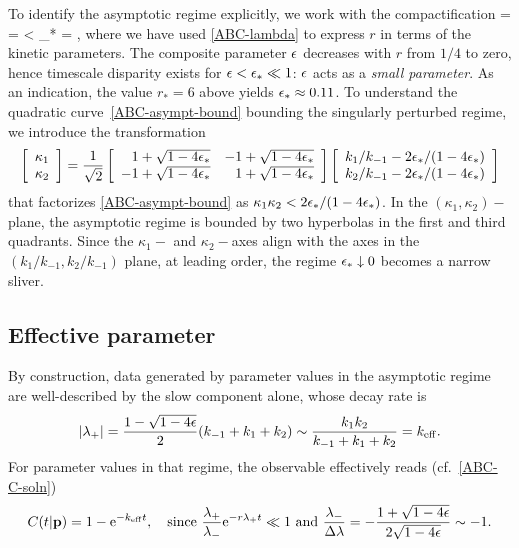 To identify the asymptotic regime explicitly, we work with the compactification
%
\be
 \eps
=
=
<
 \eps_*
=
 ,
\label{ABC-asympt-bound}
\ee
%
where we have used \eqref{ABC-lambda} to express $r$ in terms of the kinetic parameters.
The composite parameter $\epsilon$ decreases with $r$ from $1/4$ to zero,
hence timescale disparity exists for $\epsilon < \epsilon_* \ll 1$: $\epsilon$ acts as a \emph{small parameter}.
As an indication, the value $r_*=6$ above yields $\epsilon_* \approx 0.11$.
To understand the quadratic curve~\eqref{ABC-asympt-bound} bounding the singularly perturbed regime,
we introduce the transformation
%
\[
\left[\begin{array}{c}
 \kappa_1 \\ \kappa_2
\end{array}\right]
=
 \frac{1}{\sqrt2}
%
\left[\begin{array}{rr}
 1+\sqrt{1-4\eps_*} & -1+\sqrt{1-4\eps_*} \\ -1+\sqrt{1-4\eps_*} & 1+\sqrt{1-4\eps_*}
\end{array}\right]
%
\left[\begin{array}{c}
 k_1/k_{-1} - 2 \eps_*/(1 - 4 \eps_*) \\ k_2/k_{-1} - 2 \eps_*/(1 - 4 \eps_*)
\end{array}\right]
\]
%
that factorizes \eqref{ABC-asympt-bound} as $\kappa_1 \kappa_2 < 2 \epsilon_*/(1 - 4 \epsilon_*)$.
In the $(\kappa_1,\kappa_2)-$plane, the asymptotic regime is bounded by two hyperbolas in the first and third quadrants.
Since the $\kappa_1-$ and $\kappa_2-$axes align with the axes in the $(k_1/k_{-1},k_2/k_{-1})$ plane, at leading order,
the regime $\epsilon_* \downarrow 0$ becomes a narrow sliver.\\
%
\subsection{Effective parameter}
%
By construction, data generated by parameter values in the asymptotic
regime are well-described by the slow component alone, whose decay
rate is
%
\[
 \vert \lambda_+ \vert
=
 \frac{1 - \sqrt{1-4\epsilon}}{2}
 (k_{-1}+k_1+k_2)
\sim
 \frac{k_1 k_2}{k_{-1}+k_1+k_2}
=
 k_\mathrm{eff} .
\]
%
For parameter values in that regime, the observable effectively reads (cf.~\eqref{ABC-C-soln})
%
\[
 C(t \vert \mathbf{p})
=
 1
-
 \mathrm{e}^{-k_\mathrm{eff} t} ,
\quad\mbox{since}\
 \frac{\lambda_+}{\lambda_-}
 \mathrm{e}^{-r \lambda_+ t}
\ll
 1
\ \mbox{and} \
 \frac{\lambda_-}{\Delta\lambda}
=
-
\frac{
 1 + \sqrt{1 - 4 \epsilon}
}{
 2 \sqrt{1 - 4 \epsilon}
}
\sim
 -1 .
\]
%

